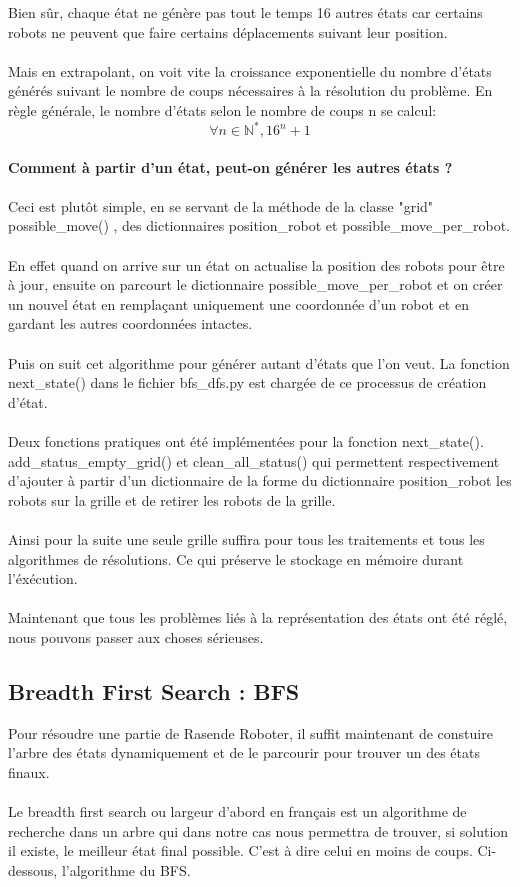\documentclass{article}
\begin{document}
Bien sûr, chaque état ne génère pas tout le temps 16 autres états car certains robots ne peuvent que faire certains déplacements suivant leur position.\\\\
Mais en extrapolant, on voit vite la croissance exponentielle du nombre d'états générés suivant le nombre de coups nécessaires à la résolution du problème. En règle générale, le nombre d'états selon le nombre de coups n se calcul:\\ \[\forall n \in \mathbb{N^*} , 16^{n} + 1\] \\
\textbf{Comment à partir d'un état, peut-on générer les autres états ?}\\\\
Ceci est plutôt simple, en se servant de la méthode de la classe "grid" possible\_move() , des dictionnaires position\_robot et possible\_move\_per\_robot.\\\\
En effet quand on arrive sur un état on actualise la position des robots pour être à jour, ensuite on parcourt le dictionnaire possible\_move\_per\_robot et on créer un nouvel état en remplaçant uniquement une coordonnée d'un robot et en gardant les autres coordonnées intactes.\\\\
Puis on suit cet algorithme pour générer autant d'états que l'on veut. La fonction next\_state() dans le fichier bfs\_dfs.py est chargée de ce processus de création d'état.\\\\
Deux fonctions pratiques ont été implémentées pour la fonction next\_state(). add\_status\_empty\_grid() et clean\_all\_status() qui permettent respectivement d'ajouter à partir d'un dictionnaire de la forme du dictionnaire position\_robot les robots sur la grille et de retirer les robots de la grille.\\\\
Ainsi pour la suite une seule grille suffira pour tous les traitements et tous les algorithmes de résolutions. Ce qui préserve le stockage en mémoire durant l'éxécution.\\\\
Maintenant que tous les problèmes liés à la représentation des états ont été réglé, nous pouvons passer aux choses sérieuses.
\subsection{Breadth First Search : BFS}
Pour résoudre une partie de Rasende Roboter, il suffit maintenant de constuire l'arbre des états dynamiquement et de le parcourir pour trouver un des états finaux.\\\\
Le breadth first search ou largeur d'abord en français est un algorithme de recherche dans un arbre qui dans notre cas nous permettra de trouver, si solution il existe, le meilleur état final possible. C'est à dire celui en moins de coups. Ci-dessous, l'algorithme du BFS.
\end{document}
